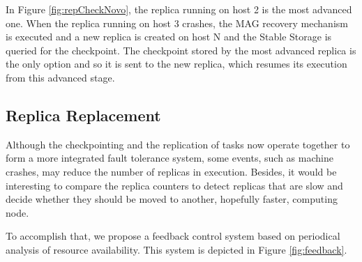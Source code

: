 \documentclass{cpeauth}
\begin{document}
In Figure \ref{fig:repCheckNovo}, the replica running on host 2 is the most advanced one. When
the replica running on host 3 crashes, the MAG recovery mechanism is executed
and a new replica is created on host N and the Stable Storage is queried for the
checkpoint. The checkpoint stored by the most advanced replica is the only
option and so it is sent to the new replica, which resumes its execution
from this advanced stage. 

\subsection{Replica Replacement}

Although the checkpointing and the replication of tasks now operate together to
form a more integrated fault tolerance system, some events, such as machine crashes,
may reduce the number of replicas in execution. Besides,
it would be interesting to compare the replica counters to
detect replicas that are slow and decide whether they should be moved 
to another, hopefully faster, computing node.

To accomplish that, we propose a feedback control system based on periodical
analysis of resource availability. This system is depicted in Figure
\ref{fig:feedback}.
\end{document}
